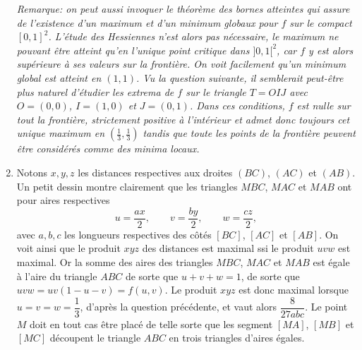 \begin{enonce}
\begin{solution}
\begin{enumerate}
    {\itshape Remarque: on peut aussi invoquer le théorème des bornes
      atteintes qui assure de l'existence d'un maximum et d'un minimum
      globaux pour $f$ sur le compact $[0,1]^2$. L'étude des
      Hessiennes n'est alors pas nécessaire, le maximum ne pouvant
      être atteint qu'en l'unique point critique dans $]0,1[^2$, car
      $f$ y est alors supérieure à ses valeurs sur la frontière. On
      voit facilement qu'un minimum global est atteint en $(1,1)$. Vu la
      question suivante, il semblerait peut-être
      plus naturel d'étudier les extrema de $f$ sur le triangle $T=OIJ$
      avec $O=(0,0)$, $I=(1,0)$ et $J=(0,1)$. Dans ces conditions, $f$
      est nulle sur tout la frontière, strictement positive à
      l'intérieur et admet donc toujours cet unique maximum en
      $(\frac13,\frac13)$ tandis que toute les points de la frontière
      peuvent être considérés comme des minima locaux.}
  \item Notons $x,y,z$ les distances respectives aux droites $(BC)$,
    $(AC)$ et $(AB)$. Un petit dessin montre clairement que les
    triangles $MBC$, $MAC$ et $MAB$ ont pour aires respectives
    \[u=\dfrac{ax}2,\qquad v=\dfrac{by}{2},\qquad w=\dfrac{cz}2,\]
    avec $a,b,c$ les longueurs respectives des côtés $[BC]$, $[AC]$ et
    $[AB]$. On voit ainsi que le produit $xyz$ des distances est
    maximal ssi le produit $uvw$ est maximal. Or la somme des aires
    des triangles $MBC$, $MAC$ et $MAB$ est égale à l'aire du triangle
    $ABC$ de sorte que $u+v+w=1$, de sorte que
    $uvw=uv(1-u-v)=f(u,v)$. Le produit $xyz$ est donc maximal lorsque
    $u=v=w=\dfrac13$, d'après la question précédente, et vaut alors
    $\dfrac{8}{27abc}$. Le point $M$ doit en tout cas être placé de
    telle sorte que les segment $[MA]$, $[MB]$ et $[MC]$ découpent le
    triangle $ABC$ en trois triangles d'aires égales.
  \end{enumerate}
\end{solution}
\end{enonce}